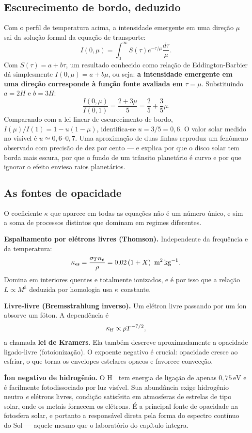 \documentclass[11pt,a4paper]{article}
\begin{document}
\subsection*{Escurecimento de bordo, deduzido}

Com o perfil de temperatura acima, a intensidade emergente em uma direção $\mu$ sai da solução formal da equação de transporte:
\[
I(0,\mu)=\int_0^{\infty}S(\tau)e^{-\tau/\mu}\frac{d\tau}{\mu}.
\]
Com $S(\tau)=a+b\tau$, um resultado conhecido como relação de Eddington-Barbier dá simplesmente $I(0,\mu)=a+b\mu$, ou seja: \textbf{a intensidade emergente em uma direção corresponde à função fonte avaliada em $\tau=\mu$}. Substituindo $a=2H$ e $b=3H$:
\[
\frac{I(0,\mu)}{I(0,1)}=\frac{2+3\mu}{5}=\frac{2}{5}+\frac{3}{5}\mu.
\]
Comparando com a lei linear de escurecimento de bordo, $I(\mu)/I(1)=1-u(1-\mu)$, identifica-se $u=3/5=0{,}6$. O valor solar medido no visível é $u\simeq0{,}6$--$0{,}7$. Uma aproximação de duas linhas reproduz um fenômeno observado com precisão de dez por cento --- e explica por que o disco solar tem borda mais escura, por que o fundo de um trânsito planetário é curvo e por que ignorar o efeito enviesa raios planetários.

\subsection*{As fontes de opacidade}

O coeficiente $\kappa$ que aparece em todas as equações não é um número único, e sim a soma de processos distintos que dominam em regimes diferentes.

\textbf{Espalhamento por elétrons livres (Thomson).} Independente da frequência e da temperatura:
\[
\kappa_{\rm es}=\frac{\sigma_Tn_e}{\rho}=0{,}02\left(1+X\right)\ \mathrm{m^{2}\,kg^{-1}}.
\]
Domina em interiores quentes e totalmente ionizados, e é por isso que a relação $L\propto M^{3}$ deduzida por homologia usa $\kappa$ constante.

\textbf{Livre-livre (Bremsstrahlung inverso).} Um elétron livre passando por um íon absorve um fóton. A dependência é
\[
\kappa_{\rm ff}\propto\rho T^{-7/2},
\]
a chamada \textbf{lei de Kramers}. Ela também descreve aproximadamente a opacidade ligado-livre (fotoionização). O expoente negativo é crucial: opacidade cresce ao esfriar, o que torna os envelopes estelares opacos e favorece convecção.

\textbf{Íon negativo de hidrogênio.} O $\mathrm{H^{-}}$ tem energia de ligação de apenas $0{,}75\,\mathrm{eV}$ e é facilmente fotodissociado por luz visível. Sua abundância exige hidrogênio neutro \emph{e} elétrons livres, condição satisfeita em atmosferas de estrelas de tipo solar, onde os metais fornecem os elétrons. É a principal fonte de opacidade na fotosfera solar, e portanto a responsável direta pela forma do espectro contínuo do Sol --- aquele mesmo que o laboratório do capítulo integra.
\end{document}
